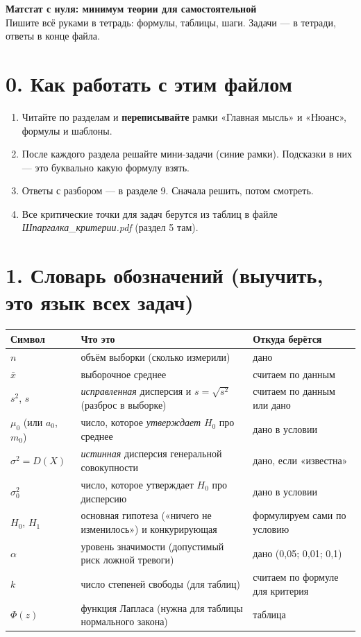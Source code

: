 \documentclass[a4paper,11pt]{extarticle}
\begin{document}
\begin{center}{\LARGE\bfseries Матстат с нуля: минимум теории для самостоятельной}\\[3pt]
{\small Пишите всё руками в тетрадь: формулы, таблицы, шаги. Задачи --- в тетради, ответы в конце файла.}\end{center}

\section*{0. Как работать с этим файлом}
\begin{enumerate}
\item Читайте по разделам и \textbf{переписывайте} рамки «Главная мысль» и «Нюанс», формулы и шаблоны.
\item После каждого раздела решайте мини-задачи (синие рамки). Подсказки в них --- это буквально какую формулу взять.
\item Ответы с разбором --- в разделе 9. Сначала решить, потом смотреть.
\item Все критические точки для задач берутся из таблиц в файле \emph{Шпаргалка\_критерии.pdf} (раздел 5 там).
\end{enumerate}

\section*{1. Словарь обозначений (выучить, это язык всех задач)}
\renewcommand{\arraystretch}{1.25}
\noindent\begin{tabular}{|>{\centering\arraybackslash}p{2.4cm}|p{8.2cm}|p{5.2cm}|}\hline
\textbf{Символ} & \textbf{Что это} & \textbf{Откуда берётся}\\\hline
$n$ & объём выборки (сколько измерили) & дано\\\hline
$\bar x$ & выборочное среднее & считаем по данным\\\hline
$s^2$, $s$ & \emph{исправленная} дисперсия и $s=\sqrt{s^2}$ (разброс в выборке) & считаем по данным или дано\\\hline
$\mu_0$ (или $a_0$, $m_0$) & число, которое \emph{утверждает} $H_0$ про среднее & дано в условии\\\hline
$\sigma^2=D(X)$ & \emph{истинная} дисперсия генеральной совокупности & дано, если «известна»\\\hline
$\sigma_0^2$ & число, которое утверждает $H_0$ про дисперсию & дано в условии\\\hline
$H_0$, $H_1$ & основная гипотеза («ничего не изменилось») и конкурирующая & формулируем сами по условию\\\hline
$\alpha$ & уровень значимости (допустимый риск ложной тревоги) & дано (0,05; 0,01; 0,1)\\\hline
$k$ & число степеней свободы (для таблиц) & считаем по формуле для критерия\\\hline
$\Phi(z)$ & функция Лапласа (нужна для таблицы нормального закона) & таблица\\\hline
\end{tabular}
\end{document}
